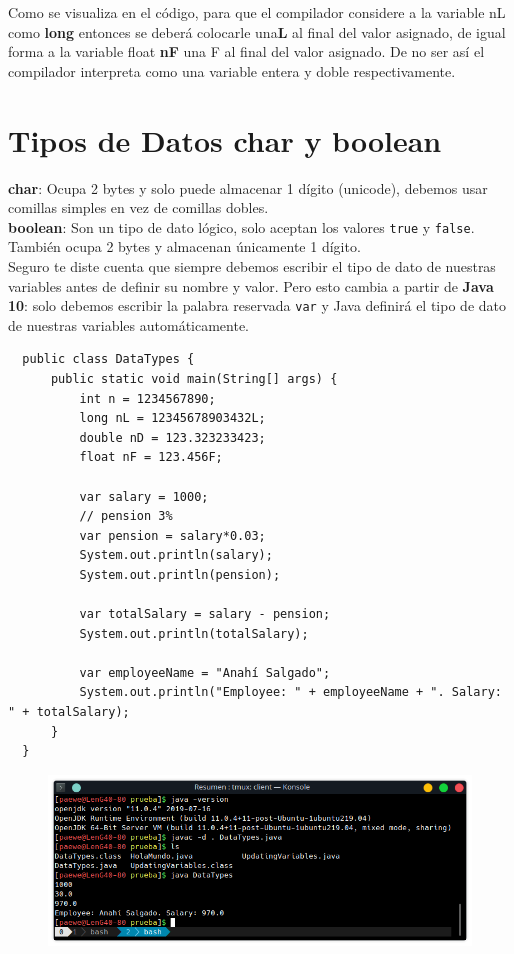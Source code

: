 \documentclass{article}
\begin{document}
Como se visualiza en el código, para que el compilador considere a la variable
nL como \textbf{long} entonces se deberá colocarle una\textbf{L} al final del
valor asignado, de igual forma a la variable float \textbf{nF} una F al final
del valor asignado. De no ser así el compilador interpreta como una variable
entera y doble respectivamente.


\section{Tipos de Datos char y boolean}%
\textbf{char}: Ocupa 2 bytes y solo puede almacenar 1 dígito (unicode), debemos
usar comillas simples en vez de comillas dobles.\\
\textbf{boolean}: Son un tipo de dato lógico, solo aceptan los valores
\texttt{true} y \texttt{false}. También ocupa 2 bytes y almacenan únicamente 1
dígito.\\

Seguro te diste cuenta que siempre debemos escribir el tipo de dato de nuestras
variables antes de definir su nombre y valor. Pero esto cambia a partir de
\textbf{Java 10}: solo debemos escribir la palabra reservada \texttt{var} y
Java definirá el tipo de dato de nuestras variables automáticamente.

\begin{verbatim}
  public class DataTypes {
      public static void main(String[] args) {
          int n = 1234567890;
          long nL = 12345678903432L;
          double nD = 123.323233423;
          float nF = 123.456F;

          var salary = 1000;
          // pension 3%
          var pension = salary*0.03;
          System.out.println(salary);
          System.out.println(pension);

          var totalSalary = salary - pension;
          System.out.println(totalSalary);

          var employeeName = "Anahí Salgado";
          System.out.println("Employee: " + employeeName + ". Salary: " + totalSalary);
      }
  }
\end{verbatim}

\begin{figure}[h!]
  \centering
  \includegraphics[scale=0.75]{./Pictures/039_DataTypes.png}
\end{figure}
\end{document}
